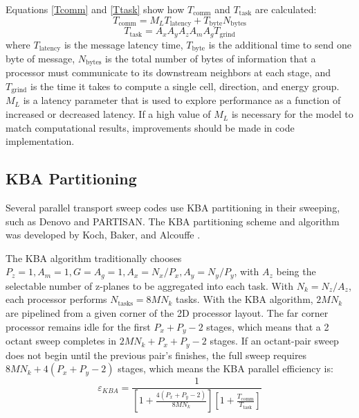 \documentclass[11pt, letterpaper,titlepage,oneside]{article}
\begin{document}
Equations \ref{Tcomm} and \ref{Ttask} show how $T_{\text{comm}}$ and $T_{\text{task}}$ are calculated:
\begin{equation}
T_{\text{comm}} = M_L T_{\text{latency}} + T_{\text{byte}} N_{\text{bytes}}
\label{Tcomm}
\end{equation}
\begin{equation}
T_{\text{task}} = A_x A_y A_z A_m A_g T_{\text{grind}}
\label{Ttask}
\end{equation}
where $T_{\text{latency}}$ is the message latency time, $T_{\text{byte}}$ is the additional time to send one byte of message, $N_{\text{bytes}}$ is the total number of bytes of information that a processor must communicate to its downstream neighbors at each stage, and $T_{\text{grind}}$ is the time it takes to compute a single cell, direction, and energy group. $M_L$ is a latency parameter that is used to explore performance as a function of increased or decreased latency. If a high value of $M_L$ is necessary for the model to match computational results, improvements should be made in code implementation.

\subsection{KBA Partitioning}

Several parallel transport sweep codes use KBA partitioning in their sweeping, such as Denovo \cite{denovo} and PARTISAN\cite{partisan}. The KBA partitioning scheme and algorithm was developed by Koch, Baker, and Alcouffe \cite{KBA}.

The KBA algorithm traditionally chooses $P_z = 1, A_m = 1, G = A_g = 1, A_x = N_x/P_x, A_y = N_y/P_y$, with $A_z$ being the selectable number of z-planes to be aggregated into each task. With $N_k = N_z/A_z$, each processor performs $N_{\text{tasks}} = 8MN_k$ tasks. With the KBA algorithm, $2MN_k$ are pipelined from a given corner of the 2D processor layout. The far corner processor remains idle for the first $P_x + P_y - 2 $ stages, which means that a 2 octant sweep completes in $2MN_k + P_x + P_y - 2$ stages. If an octant-pair sweep does not begin until the previous pair's finishes, the full sweep requires $8MN_k + 4(P_x+P_y-2)$ stages, which means the KBA parallel efficiency is:
\begin{equation}
\varepsilon_{KBA} = \frac{1}{[1+\frac{4(P_x+P_y-2)}{8MN_k}][1+\frac{T_{\text{comm}}}{T_{\text{task}}}]}
\label{eKBA}
\end{equation}
\end{document}
